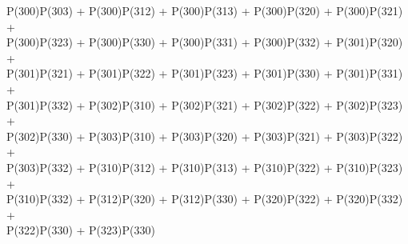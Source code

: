 P(300)P(303) + P(300)P(312) + P(300)P(313) + P(300)P(320) + P(300)P(321) +\\
P(300)P(323) + P(300)P(330) + P(300)P(331) + P(300)P(332) + P(301)P(320) +\\
P(301)P(321) + P(301)P(322) + P(301)P(323) + P(301)P(330) + P(301)P(331) +\\
P(301)P(332) + P(302)P(310) + P(302)P(321) + P(302)P(322) + P(302)P(323) +\\
P(302)P(330) + P(303)P(310) + P(303)P(320) + P(303)P(321) + P(303)P(322) +\\
P(303)P(332) + P(310)P(312) + P(310)P(313) + P(310)P(322) + P(310)P(323) +\\
P(310)P(332) + P(312)P(320) + P(312)P(330) + P(320)P(322) + P(320)P(332) +\\
P(322)P(330) + P(323)P(330)